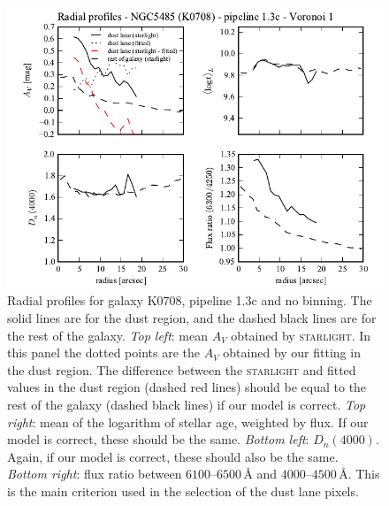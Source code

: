 \documentclass[a4paper]{article}
\newcommand{\angstrom}{\text{\AA}}
\def\starlight{\textsc{starlight}\xspace}
\begin{document}

\begin{figure}
\includegraphics{figures/radprof_K0708_1.3c_v01.pdf}

\caption{Radial profiles for galaxy K0708, pipeline 1.3c and no binning. The
solid lines are for the dust region, and the dashed black lines are for the rest
of the galaxy. {\em Top left}: mean $A_V$ obtained by \starlight. In this panel
the dotted points are the $A_V$ obtained by our fitting in the dust region. The
difference between the \starlight and fitted values in the dust region (dashed
red lines) should be equal to the rest of the galaxy (dashed black lines) if
our model is correct. {\em Top right}: mean of the logarithm of stellar age,
weighted by flux. If our model is correct, these should be the same. {\em Bottom
left}: $D_n(4000)$. Again, if our model is correct, these should also be the
same. {\em Bottom right}: flux ratio between $6100$--$6500\,\angstrom$ and
$4000$--$4500\,\angstrom$. This is the main criterion used in the selection of
the dust lane pixels.}
\label{fig:radprofK0708}
\end{figure}
\end{document}
